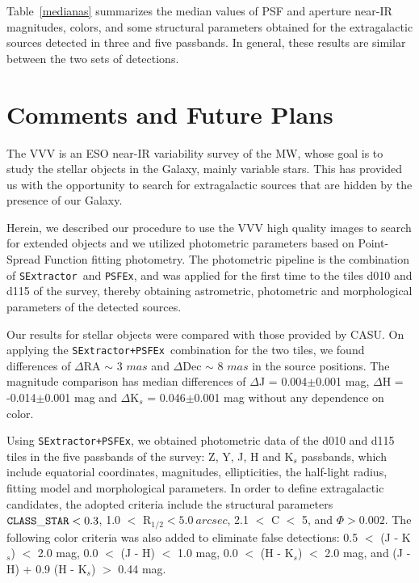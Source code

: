 \documentclass[preprint2]{aastex}
\newcommand{\se}{{\tt SExtractor\ }}
\newcommand{\dos}{{\tt SExtractor+PSFEx\ }}
\begin{document}
Table~\ref{medianas} summarizes the median 
values of PSF and aperture near-IR magnitudes,  colors, and some structural 
parameters 
obtained for the extragalactic sources detected in three and five
passbands. In general, these results
are similar between the two sets of detections. 

\section{Comments and Future Plans}

The VVV  
is an ESO near-IR variability survey of the MW, whose goal is to
study the stellar objects in the Galaxy, mainly variable stars.  This has
provided us with the opportunity to search
for extragalactic sources that are hidden by the presence of our Galaxy.

Herein, we described our procedure to use the VVV high quality images 
to search for extended objects and we utilized 
photometric parameters based on Point-Spread 
Function fitting photometry.   
The photometric pipeline is the combination of 
\se and {\tt PSFEx},  and was applied for the first time to the
tiles d010 and d115 of the survey, thereby obtaining astrometric, photometric and 
morphological parameters of the detected sources.  

Our results for stellar objects were compared with those provided by 
CASU.  On applying the  \dos combination for the two
tiles, we found differences of $\Delta$RA $\sim$ 3 $mas$ and 
$\Delta$Dec $\sim$ 8 $mas$ in the source positions.  
 The magnitude comparison has 
 median differences  of $\Delta$J = 0.004$\pm$0.001 mag,  
$\Delta$H = -0.014$\pm$0.001 mag and 
$\Delta$K$_s$ = 0.046$\pm$0.001 mag without any dependence on color.  

Using {\tt SExtractor+PSFEx}, we obtained photometric data of the d010 and
d115 tiles in 
the five passbands of the survey: Z, Y, J, 
H and K$_s$ passbands, which include equatorial coordinates, magnitudes, 
ellipticities, the half-light radius, fitting model and morphological
parameters.  In order to define  extragalactic candidates, the adopted
criteria include the structural parameters 
${\tt CLASS\_STAR} < 0.3$, 1.0 $<$ R$_{1/2} < 5.0~arcsec$, 2.1 $<$ C $<$ 5, 
and $\Phi > 0.002$.  The following color criteria was also added to
eliminate false detections:
0.5 $<$ (J - K$_s$) $<$ 2.0 mag, 0.0 $<$ (J - H) $<$ 1.0 mag,  
0.0 $<$ (H - K$_s$) $<$ 2.0 mag, and (J - H) + 0.9 (H - K$_s$) $>$ 0.44 mag.
\end{document}
